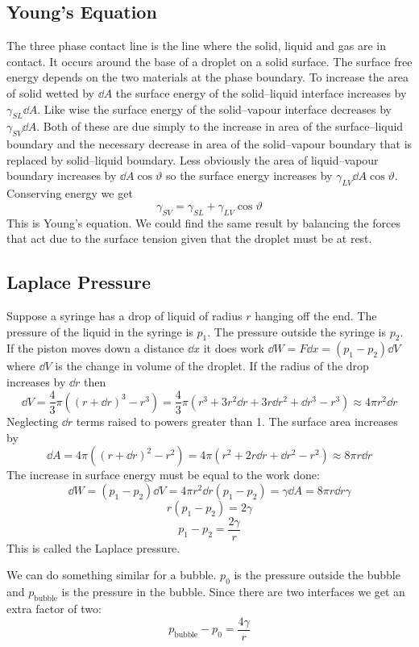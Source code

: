 \documentclass{article}
\begin{document}
    \subsection{Young's Equation}
    The three phase contact line is the line where the solid, liquid and gas are in contact.
    It occurs around the base of a droplet on a solid surface.
    The surface free energy depends on the two materials at the phase boundary.
    To increase the area of solid wetted by \(\dd A\) the surface energy of the solid--liquid interface increases by \(\gamma_{SL}\dd A\).
    Like wise the surface energy of the solid--vapour interface decreases by \(\gamma_{SV}\dd A\).
    Both of these are due simply to the increase in area of the surface--liquid boundary and the necessary decrease in area of the solid--vapour boundary that is replaced by solid--liquid boundary.
    Less obviously the area of liquid--vapour boundary increases by \(\dd A\cos\vartheta\) so the surface energy increases by \(\gamma_{LV}\dd A\cos\vartheta\).
    Conserving energy we get
    \[\gamma_{SV} = \gamma_{SL} + \gamma_{LV}\cos\vartheta\]
    This is Young's equation.
    We could find the same result by balancing the forces that act due to the surface tension given that the droplet must be at rest.
    
    \subsection{Laplace Pressure}
    Suppose a syringe has a drop of liquid of radius \(r\) hanging off the end.
    The pressure of the liquid in the syringe is \(p_1\).
    The pressure outside the syringe is \(p_2\).
    If the piston moves down a distance \(\dd x\) it does work \(\dd W = F\dd x = (p_1 - p_2)\dd V\)
    where \(\dd V\) is the change in volume of the droplet.
    If the radius of the drop increases by \(\dd r\) then
    \[\dd V = \frac{4}{3}\pi((r + \dd r)^3 - r^3) = \frac{4}{3}\pi (r^3 + 3r^2\dd r + 3r\dd r^2 + \dd r^3 - r^3) \approx 4\pi r^2\dd r\]
    Neglecting \(\dd r\) terms raised to powers greater than 1.
    The surface area increases by
    \[\dd A = 4\pi ((r + \dd r)^2 - r^2) = 4\pi (r^2 + 2r\dd r + \dd r^2 - r^2) \approx 8\pi r\dd r\]
    The increase in surface energy must be equal to the work done:
    \[\dd W = (p_1 - p_2)\dd V = 4\pi r^2\dd r(p_1 - p_2) = \gamma\dd A = 8\pi r\dd r\gamma\]
    \[r(p_1 - p_2) = 2\gamma\]
    \[p_1 - p_2 = \frac{2\gamma}{r}\]
    This is called the Laplace pressure.
    
    We can do something similar for a bubble.
    \(p_0\) is the pressure outside the bubble and \(p_\text{bubble}\) is the pressure in the bubble.
    Since there are two interfaces we get an extra factor of two:
    \[p_\text{bubble} - p_0 = \frac{4\gamma}{r}\]
    
\end{document}
